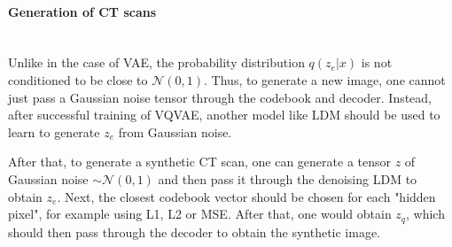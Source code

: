 \paragraph{Generation of CT scans}\mbox{}\\
\indent Unlike in the case of VAE, the probability distribution $q(z_e|x)$ is not conditioned to be close to $\mathcal{N}(0,1)$. Thus, to generate a new image, one cannot just pass a Gaussian noise tensor through the codebook and decoder.
Instead, after successful training of VQVAE, another model like LDM should be used to learn to generate $z_e$ from Gaussian noise.

After that, to generate a synthetic CT scan, one can generate a tensor $z$ of Gaussian noise $\sim\mathcal{N}(0,1)$ and then pass it through the denoising LDM to obtain $z_e$. Next, the closest codebook vector should be chosen for each "hidden pixel", for example using L1, L2 or MSE. After that, one would obtain $z_q$, which should then pass through the decoder to obtain the synthetic image.







